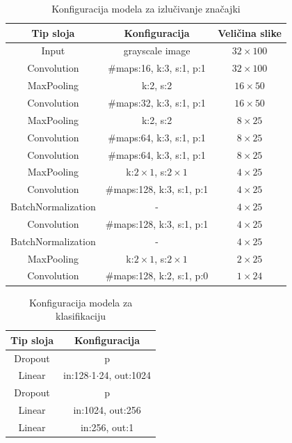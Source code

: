 \documentclass[times, utf8, diplomski]{fer}
\begin{document}
\begin{table}[H]
    \centering
    \begin{tabular}{|c|c|c|}
        \hline
        Tip sloja & Konfiguracija & Veličina slike \\
        \hline \hline
        Input & grayscale image & $32\times100$ \\
        \hline
        Convolution & \#maps:16, k:3, s:1, p:1 & $32\times100$ \\
        \hline
        MaxPooling & k:2, s:2& $16\times50$ \\
        \hline
        Convolution & \#maps:32, k:3, s:1, p:1 & $16\times50$ \\
        \hline
        MaxPooling & k:2, s:2 & $8\times25$ \\
        \hline
        Convolution & \#maps:64, k:3, s:1, p:1 & $8\times25$ \\
        \hline
        Convolution & \#maps:64, k:3, s:1, p:1 & $8\times25$ \\
        \hline
        MaxPooling & k:$2\times1$, s:$2\times1$ & $4\times25$ \\
        \hline
        Convolution & \#maps:128, k:3, s:1, p:1 & $4\times25$ \\
        \hline
        BatchNormalization & - & $4\times25$ \\
        \hline
        Convolution & \#maps:128, k:3, s:1, p:1 & $4\times25$ \\
        \hline
        BatchNormalization & - & $4\times25$ \\
        \hline
        MaxPooling & k:$2\times1$, s:$2\times1$ & $2\times25$ \\
        \hline
        Convolution & \#maps:128, k:2, s:1, p:0 & $1\times24$ \\
        \hline
    \end{tabular}
    \caption{Konfiguracija modela za izlučivanje značajki}
    \label{tab:cnn}
\end{table}

\begin{table}[H]
    \centering
    \begin{tabular}{|c|c|}
        \hline
        Tip sloja & Konfiguracija \\
        \hline \hline
        Dropout & p \\
        \hline
        Linear & in:128$\cdot$1$\cdot$24, out:1024 \\
        \hline
        Dropout & p \\
        \hline
        Linear & in:1024, out:256 \\
        \hline
        Linear & in:256, out:1 \\
        \hline
    \end{tabular}
    \caption{Konfiguracija modela za klasifikaciju}
    \label{tab:linear}
\end{table}
\end{document}
